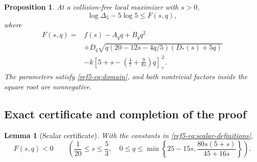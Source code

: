 \documentclass[11pt]{article}
\newtheorem{proposition}[theorem]{Proposition}
\newtheorem{lemma}[theorem]{Lemma}
\theoremstyle{remark}
\newcommand{\pos}[1]{[#1]_+}
\numberwithin{equation}{section}
\begin{document}
\begin{proposition}\label{ref5-prop:scalar}
At a collision-free local maximizer with $s>0$,
\begin{equation}\label{ref5-eq:F-bound}
 \log\Delta_5-5\log5\le F(s,q),
\end{equation}
where
\begin{equation}\label{ref5-eq:F}
\begin{aligned}
 F(s,q)={}&f(s)-A_q q+B_q q^2\\
 &+D_q\sqrt{q(20-12s-4q/5)(D_*(s)+5q)}\\
 &-k\pos{5+s-\left(\frac47+\frac9{8s}\right)q}^{\,2}.
\end{aligned}
\end{equation}
The parameters satisfy \eqref{ref5-eq:domain}, and both nontrivial factors
inside the square root are nonnegative.
\end{proposition}

\subsection{Exact certificate and completion of the proof}
\begin{lemma}[Scalar certificate]\label{ref5-lem:certificate}
With the constants in \eqref{ref5-eq:scalar-definitions},
\begin{equation}\label{ref5-eq:certificate}
 F(s,q)<0\qquad
 \left(\frac1{20}\le s\le\frac53,\quad
 0\le q\le\min\left\{25-15s,\frac{80s(5+s)}{45+16s}\right\}\right).
\end{equation}
\end{lemma}
\end{document}
